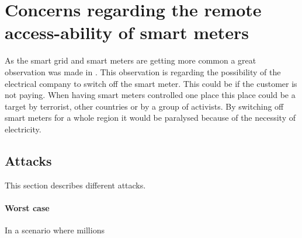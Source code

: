 \section{Concerns regarding the remote access-ability of smart meters}
As the smart grid and smart meters are getting more common a great observation was made in \citet{offswitch}.
This observation is regarding the possibility of the electrical company to switch off the smart meter.
This could be if the customer is not paying.
When having smart meters controlled one place this place could be a target by terrorist, other countries or by a group of activists.
By switching off smart meters for a whole region it would be paralysed because of the necessity of electricity.

\subsection{Attacks}
This section describes different attacks.

\paragraph{Worst case}
In a scenario where millions
